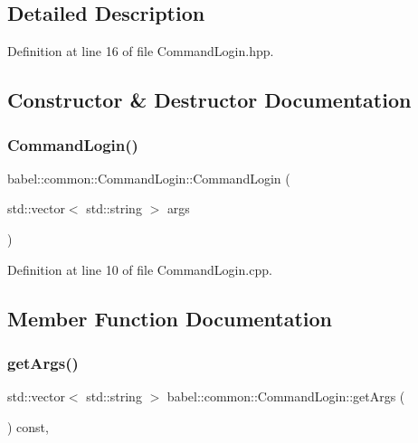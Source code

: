 \subsection{Detailed Description}


Definition at line 16 of file Command\+Login.\+hpp.



\subsection{Constructor \& Destructor Documentation}
\mbox{\label{classbabel_1_1common_1_1_command_login_a261abfc20327043934deb7b494a7956d}} 
\subsubsection{\texorpdfstring{Command\+Login()}{CommandLogin()}}
{\footnotesize\ttfamily babel\+::common\+::\+Command\+Login\+::\+Command\+Login (\begin{DoxyParamCaption}\item[{std\+::vector$<$ std\+::string $>$}]{args }\end{DoxyParamCaption})}



Definition at line 10 of file Command\+Login.\+cpp.



\subsection{Member Function Documentation}
\mbox{\label{classbabel_1_1common_1_1_command_login_a34e71a8dc0447a276907444a7e6b2ae6}} 
\subsubsection{\texorpdfstring{get\+Args()}{getArgs()}}
{\footnotesize\ttfamily std\+::vector$<$ std\+::string $>$ babel\+::common\+::\+Command\+Login\+::get\+Args (\begin{DoxyParamCaption}{ }\end{DoxyParamCaption}) const\hspace{0.3cm}{\ttfamily [override]}, {\ttfamily [virtual]}}



